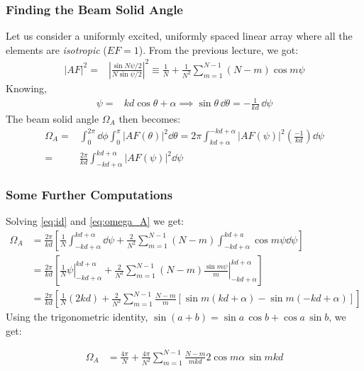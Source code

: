 \documentclass[10pt]{beamer}
\begin{document}
\begin{frame}
    \frametitle{Finding the Beam Solid Angle}
\small
    Let us consider a uniformly excited, uniformly spaced linear array where all the elements are \textit{isotropic} ($EF = 1$). From the previous lecture, we got:
    \small
    \begin{align}
        |AF|^2 {}=& \left|\frac{\sin N \psi/2 }{N \sin \psi/2 }\right|^2 \equiv \frac{1}{N} + \frac{1}{N^2} \sum_{m = 1}^{N-1} (N - m) \cos m \psi
        \label{eq:id}
    \end{align}
    \small
    Knowing,
    \small
    \begin{align*}
        \psi {}=& k d \cos \theta + \alpha
        \implies \sin \theta \, \dd \theta = -\frac{1}{k d} \, \dd \psi
    \end{align*}
\small
The beam solid angle $\Omega_A$ then becomes:
\small
\begin{align}
    \Omega_A {}=& \int_{0}^{2 \pi} \dd \phi \int_{0}^{\pi} |AF(\theta)|^2 \dd \theta = 2 \pi \int_{kd + \alpha}^{{-kd + \alpha}} |AF(\psi)|^2 \left(\frac{-1}{kd}\right) \dd \psi \nonumber \\
    {}=& \frac{2 \pi }{k d} \int_{-kd + \alpha}^{{kd + \alpha}} |AF(\psi)|^2 \dd \psi
    \label{eq:omega_A}
\end{align}
\end{frame}


\begin{frame}
    \frametitle{Some Further Computations}

    Solving \eqref{eq:id} and \eqref{eq:omega_A} we get:
    \begin{align*}
        \Omega_{A} &=\frac{2 \pi}{k d}\left[\frac{1}{N} \int_{-k d+\alpha}^{k d+\alpha} \dd \psi+\frac{2}{N^{2}} \sum_{m=1}^{N-1}(N-m) \int_{-k d+\alpha}^{k d+a} \cos m \psi \dd \psi\right] \\
        &=\frac{2 \pi}{k d}\left[\left.\frac{1}{N} \psi\right|_{-k d+\alpha} ^{k d+\alpha}+\left.\frac{2}{N^{2}} \sum_{m=1}^{N-1}(N-m) \frac{\sin m \psi}{m}\right|_{-k d+\alpha} ^{k d+\alpha}\right] \\
        &=\frac{2 \pi}{k d}\left[\frac{1}{N}(2 k d)+\frac{2}{N^{2}} \sum_{m=1}^{N-1} \frac{N-m}{m}[\sin m(k d+\alpha)-\sin m(-k d+\alpha)]\right]
        \end{align*}
    Using the trigonometric identity, $\sin (a+b) = \sin a \, \cos b + \cos a \, \sin b$, we get:
    \begin{tcolorbox}[colback=blue!5]
        \begin{align*}
            \Omega_A   &=\frac{4 \pi}{N}+\frac{4 \pi}{N^{2}} \sum_{m=1}^{N-1} \frac{N-m}{m k d} 2 \cos m \alpha \, \sin m k d
           \end{align*}
  \end{tcolorbox}
\end{frame}
\end{document}
